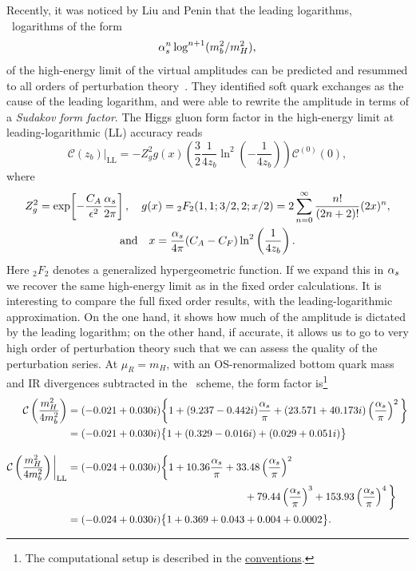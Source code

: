 Recently, it was noticed by Liu and Penin that the leading logarithms, \ie\ logarithms of the form
\begin{equation}
\alpha_s^n \log^{n + 1} (m_b^2/m_H^2),
\end{equation}
of the high-energy limit of the virtual amplitudes can be predicted and resummed to all orders of perturbation theory~\cite{Liu:2017vkm}. They identified soft quark exchanges as the cause of the leading logarithm, and were able to rewrite the amplitude in terms of a \textit{Sudakov form factor}. The Higgs gluon form factor in the high-energy limit at leading-logarithmic (\acs{LL}) accuracy reads
\begin{equation}
\mathcal{C}(z_b) \bigg \vert_{\text{LL}} = - Z_g^2 g(x) \left(\frac{3}{2} \frac{1}{4z_b} \ln^2 \left(-\frac{1}{4z_b} \right) \right) \mathcal{C}^{(0)}(0),
\end{equation}
where
\begin{equation}
\begin{gathered}
Z_g^2 = \exp\! \left[- \frac{C_A}{\epsilon^2} \frac{\alpha_s}{2 \pi} \right], \quad g(x) = {}_2F_2(1, 1;3/2,2;x/2) = 2 \sum_{n = 0}^\infty \frac{n!}{(2 n + 2)!} (2 x)^{n}, \\
\text{and} \quad x = \frac{\alpha_s}{4 \pi} (C_A - C_F) \ln^2\left(\frac{1}{4 z_b} \right).
\end{gathered}
\label{eq:5:sudakov_resummation}
\end{equation}
Here ${}_2F_{2}$ denotes a generalized hypergeometric function. If we expand this in $\alpha_s$ we recover the same high-energy limit as in the fixed order calculations. It is interesting to compare the full fixed order results, with the leading-logarithmic approximation. On the one hand, it shows how much of the amplitude is dictated by the leading logarithm; on the other hand, if accurate, it allows us to go to very high order of perturbation theory such that we can assess the quality of the perturbation series. At $\mu_R = m_H$, with an \acs{OS}-renormalized bottom quark mass and \acs{IR} divergences subtracted in the \MS\ scheme, the form factor is\footnote{The computational setup is described in the \hyperref[chap:notation_and_conventions]{conventions}.}
\begin{equation}
\begin{split}
\mathcal{C} \left(\frac{m_H^2}{4 m_b^2}\right) &= (-0.021 + 0.030 i) \bigg \lbrace 1 + (9.237 - 0.442 i) \frac{\alphas}{\pi} + (23.571 + 40.173 i) \left(\frac{\alphas}{\pi} \right)^2 \bigg \rbrace \\
&= (-0.021 + 0.030 i) \big \lbrace 1 + (0.329 - 0.016 i) + (0.029 + 0.051 i) \big \rbrace \\[10pt]
%
\mathcal{C} \left(\frac{m_H^2}{4 m_b^2} \right) \bigg \vert_{\text{LL}} &= (-0.024 + 0.030 i) \bigg \lbrace 1 + 10.36 \frac{\alphas}{\pi} + 33.48 \left(\frac{\alphas}{\pi} \right)^2  \\
&\hspace{6cm} + 79.44 \left(\frac{\alphas}{\pi}\right)^3 + 153.93 \left( \frac{\alphas}{\pi} \right)^4 \bigg \rbrace \\
&= (-0.024 + 0.030 i) \big \lbrace 1 + 0.369 + 0.043 + 0.004 + 0.0002 \big \rbrace .
\end{split}
\label{eq:5:LL_comparison}
\end{equation}
